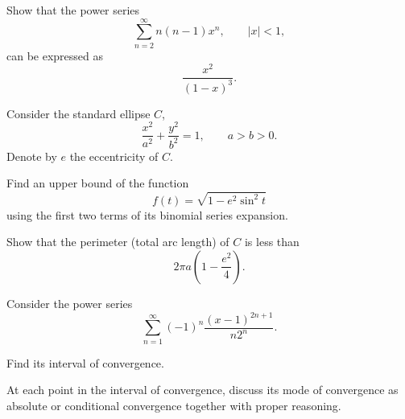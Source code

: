 \begin{problem}
Show that the power series
\[
\sum_{n=2}^{\infty}n(n-1)x^n,
\qquad |x|<1,
\]
can be expressed as
\[
\frac{x^2}{(1-x)^3}.
\]
\end{problem}

\begin{problem}
Consider the standard ellipse $C$,
\[
\frac{x^2}{a^2}+\frac{y^2}{b^2}=1,
\qquad a>b>0.
\]
Denote by $e$ the eccentricity of $C$.
\begin{problemsubparts}
\item Find an upper bound of the function
\[
f(t)=\sqrt{1-e^2\sin^2 t}
\]
using the first two terms of its binomial series expansion.
\item Show that the perimeter (total arc length) of $C$ is less than
\[
2\pi a\left(1-\frac{e^2}{4}\right).
\]
\end{problemsubparts}
\end{problem}

\begin{problem}
Consider the power series
\[
\sum_{n=1}^{\infty}(-1)^n\frac{(x-1)^{2n+1}}{n2^n}.
\]
\begin{problemsubparts}
\item Find its interval of convergence.
\item At each point in the interval of convergence, discuss its mode of convergence as absolute or conditional convergence together with proper reasoning.
\end{problemsubparts}
\end{problem}

